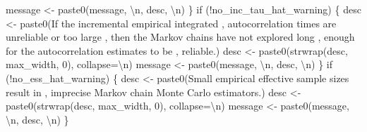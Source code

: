 \documentclass[
  letterpaper,
  DIV=11,
  numbers=noendperiod]{scrartcl}
\newenvironment{Shaded}{\begin{snugshade}}{\end{snugshade}}
\newcommand{\CharTok}[1]{\textcolor[rgb]{0.13,0.47,0.30}{#1}}
\newcommand{\ControlFlowTok}[1]{\textcolor[rgb]{0.00,0.23,0.31}{#1}}
\newcommand{\DecValTok}[1]{\textcolor[rgb]{0.68,0.00,0.00}{#1}}
\newcommand{\NormalTok}[1]{\textcolor[rgb]{0.00,0.23,0.31}{#1}}
\newcommand{\OperatorTok}[1]{\textcolor[rgb]{0.37,0.37,0.37}{#1}}
\newcommand{\StringTok}[1]{\textcolor[rgb]{0.13,0.47,0.30}{#1}}
\begin{document}
\begin{Shaded}
\begin{Highlighting}[]
\NormalTok{    message }\OperatorTok{\textless{}{-}}\NormalTok{ paste0(message, }\StringTok{\textquotesingle{}}\CharTok{\textbackslash{}n}\StringTok{\textquotesingle{}}\NormalTok{, desc, }\StringTok{\textquotesingle{}}\CharTok{\textbackslash{}n}\StringTok{\textquotesingle{}}\NormalTok{)}
\NormalTok{  \}}
  \ControlFlowTok{if}\NormalTok{ (}\OperatorTok{!}\NormalTok{no\_inc\_tau\_hat\_warning) \{}
\NormalTok{    desc }\OperatorTok{\textless{}{-}}\NormalTok{ paste0(}\StringTok{\textquotesingle{}If the incremental empirical integrated \textquotesingle{}}\NormalTok{,}
                   \StringTok{\textquotesingle{}autocorrelation times are unreliable or too large \textquotesingle{}}\NormalTok{,}
                   \StringTok{\textquotesingle{}then the Markov chains have not explored long \textquotesingle{}}\NormalTok{,}
                   \StringTok{\textquotesingle{}enough for the autocorrelation estimates to be \textquotesingle{}}\NormalTok{,}
                   \StringTok{\textquotesingle{}reliable.\textquotesingle{}}\NormalTok{)}
\NormalTok{    desc }\OperatorTok{\textless{}{-}}\NormalTok{ paste0(strwrap(desc, max\_width, }\DecValTok{0}\NormalTok{), collapse}\OperatorTok{=}\StringTok{\textquotesingle{}}\CharTok{\textbackslash{}n}\StringTok{\textquotesingle{}}\NormalTok{)}
\NormalTok{    message }\OperatorTok{\textless{}{-}}\NormalTok{ paste0(message, }\StringTok{\textquotesingle{}}\CharTok{\textbackslash{}n}\StringTok{\textquotesingle{}}\NormalTok{, desc, }\StringTok{\textquotesingle{}}\CharTok{\textbackslash{}n}\StringTok{\textquotesingle{}}\NormalTok{)}
\NormalTok{  \}}
  \ControlFlowTok{if}\NormalTok{ (}\OperatorTok{!}\NormalTok{no\_ess\_hat\_warning) \{}
\NormalTok{    desc }\OperatorTok{\textless{}{-}}\NormalTok{ paste0(}\StringTok{\textquotesingle{}Small empirical effective sample sizes result in \textquotesingle{}}\NormalTok{,}
                   \StringTok{\textquotesingle{}imprecise Markov chain Monte Carlo estimators.\textquotesingle{}}\NormalTok{)}
\NormalTok{    desc }\OperatorTok{\textless{}{-}}\NormalTok{ paste0(strwrap(desc, max\_width, }\DecValTok{0}\NormalTok{), collapse}\OperatorTok{=}\StringTok{\textquotesingle{}}\CharTok{\textbackslash{}n}\StringTok{\textquotesingle{}}\NormalTok{)}
\NormalTok{    message }\OperatorTok{\textless{}{-}}\NormalTok{ paste0(message, }\StringTok{\textquotesingle{}}\CharTok{\textbackslash{}n}\StringTok{\textquotesingle{}}\NormalTok{, desc, }\StringTok{\textquotesingle{}}\CharTok{\textbackslash{}n}\StringTok{\textquotesingle{}}\NormalTok{)}
\NormalTok{  \}}


\end{Highlighting}
\end{Shaded}
\end{document}
